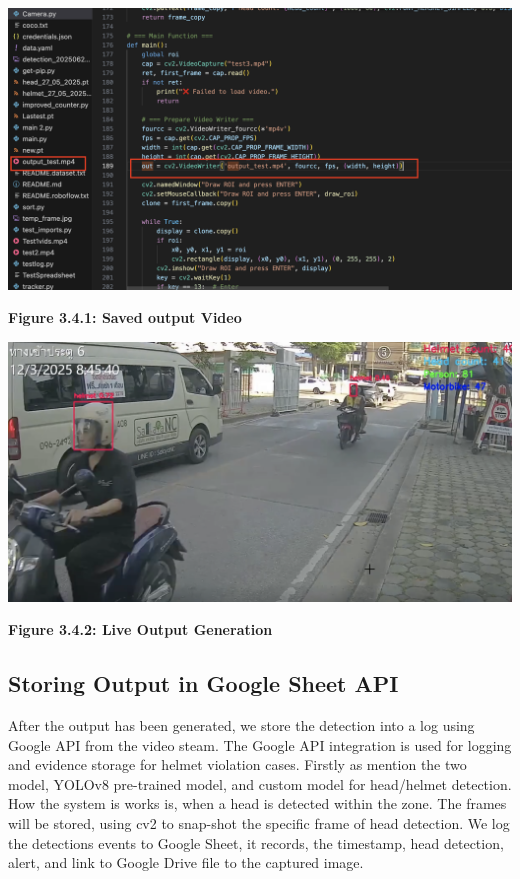 \begin{center}
	\begin{minipage}{0.45\textwidth}
		\centering
		\includegraphics[width=\linewidth]{out.png}
		\vspace{0.7em}
		
		\textbf{Figure 3.4.1: Saved output Video}
	\end{minipage}
	\hfill
	\begin{minipage}{0.45\textwidth}
		\centering
		\includegraphics[width=\linewidth]{live.png}
		\vspace{0.5em}
		
		\textbf{Figure 3.4.2: Live Output Generation}
	\end{minipage}
\end{center}


\subsection{Storing Output in Google Sheet API}
\noindent\hspace{2.5em}After the output has been generated, we store the detection into a log using Google API from the video steam. The Google API integration is used for logging and evidence storage for helmet violation cases. Firstly as mention the two model, YOLOv8 pre-trained model, and custom model for head/helmet detection. How the system is works is, when a head is detected within the zone. The frames will be stored, using cv2 to snap-shot the specific frame of head detection. We log the detections events to Google Sheet, it records, the timestamp, head detection, alert, and link to Google Drive file to the captured image.


